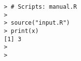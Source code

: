 \begin{Verbatim}
> # Scripts: manual.R
> 
> source("input.R")
> print(x)
[1] 3
> 
> 
\end{Verbatim}
